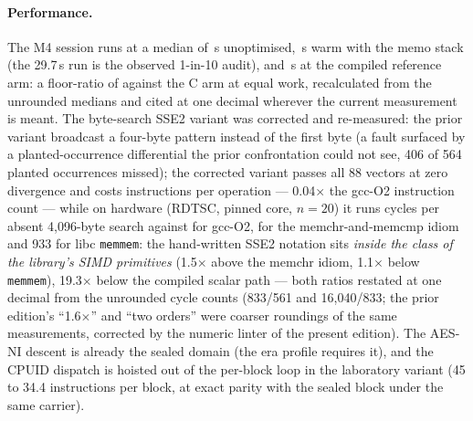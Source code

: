 \documentclass[11pt,a4paper]{article}
\newcommand{\code}[1]{\texttt{\small #1}}
\begin{document}
\paragraph{Performance.} The M4 session runs at a median of
\mquatreAvantMediane{}\,s unoptimised, \mquatreChaudMediane{}\,s warm
with the memo stack (the 29.7\,s run is the observed 1-in-10 audit),
and \mquatreBrasC{}\,s at the compiled reference arm: a floor-ratio
of \mquatreRatioChaud{} against the C arm at equal work, recalculated
from the unrounded medians and cited at one decimal wherever the
current measurement is meant. The byte-search SSE2 variant was
corrected and re-measured: the prior variant broadcast a four-byte
pattern instead of the first byte (a fault surfaced by a
planted-occurrence differential the prior confrontation could not
see, 406 of 564 planted occurrences missed); the corrected variant
passes all 88 vectors at zero divergence and costs \sseDeuxVdeuxInstructions{}
instructions per operation --- 0.04$\times$ the gcc-O2 instruction
count --- while on hardware (RDTSC, pinned core, $n{=}20$) it runs
\sseDeuxTempsReel{} cycles per absent 4{,}096-byte search against
\gccODeuxTempsReel{} for gcc-O2, \idiomeMemchrTempsReel{} for the
memchr-and-memcmp idiom and 933 for libc \code{memmem}: the
hand-written SSE2 notation sits \emph{inside the class of the library's
SIMD primitives} (1.5$\times$ above the memchr idiom, 1.1$\times$
below \code{memmem}), 19.3$\times$ below the compiled scalar path
--- both ratios restated at one decimal from the unrounded cycle
counts (833/561 and 16{,}040/833; the prior edition's ``1.6$\times$''
and ``two orders'' were coarser roundings of the same measurements,
corrected by the numeric linter of the present edition). The
AES-NI descent is already the sealed domain (the era profile requires
it), and the CPUID dispatch is hoisted out of the per-block loop in
the laboratory variant (45 to 34.4 instructions per block, at exact
parity with the sealed block under the same carrier).
\end{document}
